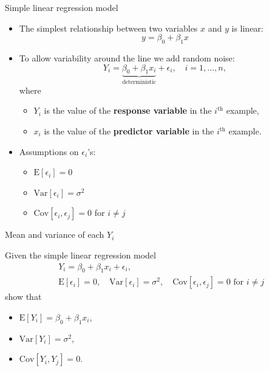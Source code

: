 \documentclass{beamer}
\newcommand{\E}{\mathrm{E}}
\newcommand{\Var}{\mathrm{Var}}
\newcommand{\Cov}{\mathrm{Cov}}
\begin{document}
\begin{frame}{Simple linear regression model}
\begin{itemize}
    \item The simplest relationship between two variables $x$ and $y$ is linear:
    $$
    y=\beta_0+\beta_1 x
    $$
    \item<2-> To allow variability around the line we add random noise:
    $$
    Y_i=\underbrace{\beta_0+\beta_1 x_i}_{\text{deterministic}} + \epsilon_i,\quad i=1,\ldots,n,
    $$
    where
    \begin{itemize}
    \item<3-> $Y_i$ is the value of the \textbf{response variable} in the $i^\text{th}$ example,
    \item<4-> $x_i$ is the value of the \textbf{predictor variable} in the $i^\text{th}$ example.
    \end{itemize}
    \item<6->Assumptions on $\epsilon_i$'s:
    \begin{itemize}
        \item<6-> $\E[\epsilon_i]=0$
        \item<7-> $\Var[\epsilon_i]=\sigma^2$
        \item<8-> $\Cov[\epsilon_i,\epsilon_j]=0$ for $i\ne j$
    \end{itemize}
\end{itemize}
\end{frame}



\begin{frame}{Mean and variance of each $Y_i$}

Given the simple linear regression model
\begin{align*}
&Y_i=\beta_0+\beta_1 x_i+\epsilon_i,\\
&\E[\epsilon_i]=0,\quad \Var[\epsilon_i]=\sigma^2,\quad \Cov[\epsilon_i,\epsilon_j]=0\text{ for }i\ne j
\end{align*}
show that
\begin{itemize}
    \item<2-> $\E[Y_i]=\beta_0 + \beta_1 x_i$,
    \item<3-> $\Var[Y_i]=\sigma^2$,
    \item<4-> $\Cov[Y_i,Y_j]=0$.
\end{itemize}
\end{frame}
\end{document}
